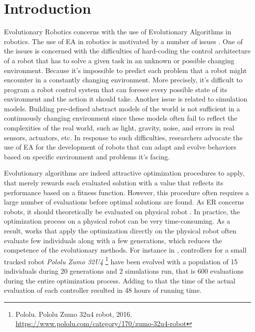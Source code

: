\chapter{Introduction}

Evolutionary Robotics concerns with the use of Evolutionary Algorithms in robotics. The use of EA in robotics is motivated by a number of issues \cite{meyer1998evolutionary} \cite{grefenstette1994evolutionary}. One of the issues is concerned with the difficulties of hard-coding the control architecture of a robot that has to solve a given task in an unknown or possible changing environment. Because it's impossible to predict each problem that a robot might encounter in a constantly changing environment. More precisely, it's difficult to program a robot control system that can foresee every possible state of its environment and the action it should take.  Another issue is related to simulation models. Building pre-defined abstract models of the world is not sufficient in a continuously changing environment since these models often fail to reflect the complexities of the real world, such as light, gravity, noise, and errors in real sensors, actuators, etc. In response to such difficulties, researchers advocate the use of EA for the development of robots that can adapt and evolve behaviors based on specific environment and problems it's facing.

Evolutionary algorithms are indeed attractive optimization procedures to apply, that merely rewards each evaluated solution with a value that reflects its performance based on a fitness function. However, this procedure often requires a large number of evaluations before optimal solutions are found. As ER concerns robots, it should theoretically be evaluated on physical robot \cite{floreano1998evolutionary}. In practice, the optimization process on a physical robot can be very time-consuming. As a result, works that apply the optimization directly on the physical robot often evaluate few individuals along with a few generations, which reduces the competence of the evolutionary methods. For instance in \cite{faina2017automating}, controllers for a small tracked robot \textit{Pololu Zumo 32U4} \footnote{Pololu. Pololu Zumo 32u4 robot, 2016. \url{https://www.pololu.com/category/170/zumo-32u4-robot}} have been evolved with a population of 15 individuals during 20 generations and 2 simulations run, that is 600 evaluations during the entire optimization process. Adding to that the time of the actual evaluation of each controller resulted in 48 hours of running time.

